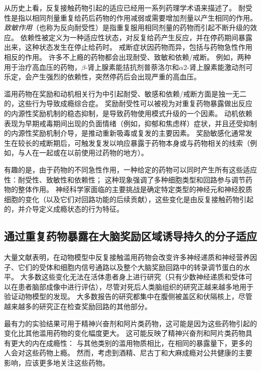 从历史上看，反复接触药物引起的适应已经用一系列药理学术语来描述了。
耐受性是指以相同剂量重复给药后药物的作用减弱或需要增加剂量以产生相同的作用。
\textit{致敏作用}（也称为反向耐受性）是指重复服用相同剂量的药物而引起不断升级的效应。
依赖性被定义为一种适应性状态，对反复给药产生反应，并在停药期间暴露出来，这种状态发生在停止给药时。
戒断症状因药物而异，包括与药物急性作用相反的作用。
许多不上瘾的药物都会出现耐受、致敏和依赖/戒断。
例如，两种用于治疗高血压的药物，$ \beta $-肾上腺素能拮抗剂普萘洛尔和$ \alpha $2-肾上腺素能激动剂可乐定，会产生强烈的依赖性，突然停药后会出现严重的高血压。


滥用药物在奖励和动机相关行为中引起耐受、敏感和依赖/戒断方面是独一无二的，这些行为导致成瘾综合症。
奖励耐受性可以被视为对重复药物暴露做出反应的内源性奖励机制的稳态抑制，是导致药物使用模式升级的一个因素。
动机依赖表现为早期戒毒期间出现的负面情绪（例如，抑郁和焦虑样）症状，并且还受抑制的内源性奖励机制介导，是推动重新吸毒或复发的主要因素。
奖励敏感化通常发生在较长的戒断期后，可触发复发以响应暴露于药物本身或与药物相关的线索（例如，与人在一起或在以前使用过药物的地方）。


有趣的是，由于药物的不同急性作用，一种给定的药物可以同时产生所有这些适应性：耐受性、致敏性和依赖性；
这种现象强调了多种细胞类型和回路参与调节药物的整体作用。
神经科学家面临的主要挑战是确定特定类型的神经元和神经胶质细胞的变化（以及它们对回路功能的后续贡献），这些变化是由反复接触药物引起的，并介导定义成瘾状态的行为特征。



\subsection{通过重复药物暴露在大脑奖励区域诱导持久的分子适应}

大量文献表明，在动物模型中反复接触滥用药物会改变许多神经递质和神经营养因子、它们的受体和细胞内信号通路以及整个大脑奖励回路中的转录调节蛋白的水平。
大多数这些变化无法在活体患者身上进行研究（只有少数神经递质和受体可以在患者脑部成像中进行评估），尽管对死后人类脑组织的研究正越来越多地用于验证动物模型的发现。
大多数报告的研究都集中在腹侧被盖区和伏隔核上，尽管越来越多的研究正在检查奖励回路的其他部分。


最有力的实验结果可用于精神兴奋剂和阿片类药物，这可能是因为这些药物引起的变化比其他滥用药物的变化幅度更大。
这可能反映了精神兴奋剂和阿片类药物具有更大的内在成瘾性：
与其他类别的滥用物质相比，在相同的暴露量下，更多的人会对这些药物上瘾。
然而，考虑到酒精、尼古丁和大麻成瘾对公共健康的主要影响，应该更多地关注这些药物。


